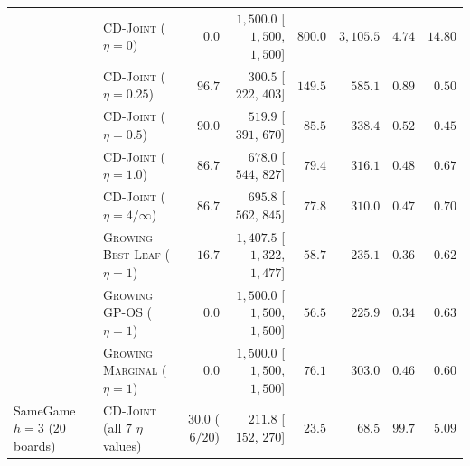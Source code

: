 \documentclass{article}
\theoremstyle{plain}
\theoremstyle{definition}
\begin{document}
\begin{table}[!htbp]
{\begin{tabular}{@{}llrrrrrr@{}}
  & \textsc{CD-Joint} ($\eta{=}0$)      & $0.0$            & $1{,}500.0$ [$1{,}500$, $1{,}500$] & $800.0$ & $3{,}105.5$ & $4.74$  & $14.80$ \\
  & \textsc{CD-Joint} ($\eta{=}0.25$)   & $\mathbf{96.7}$  & $\mathbf{300.5}$ [$222$, $403$]    & $149.5$ & $585.1$     & $\mathbf{0.89}$ & $0.50$  \\
  & \textsc{CD-Joint} ($\eta{=}0.5$)    & $90.0$           & $519.9$ [$391$, $670$]             & $85.5$  & $338.4$     & $0.52$  & $0.45$  \\
  & \textsc{CD-Joint} ($\eta{=}1.0$)    & $86.7$           & $678.0$ [$544$, $827$]             & $79.4$  & $316.1$     & $0.48$  & $0.67$  \\
  & \textsc{CD-Joint} ($\eta{=}4 / \infty$) & $86.7$       & $695.8$ [$562$, $845$]             & $77.8$  & $310.0$     & $0.47$  & $0.70$  \\
  & \textsc{Growing Best-Leaf} ($\eta{=}1$) & $16.7$       & $1{,}407.5$ [$1{,}322$, $1{,}477$] & $58.7$  & $235.1$     & $0.36$  & $0.62$  \\
  & \textsc{Growing GP-OS} ($\eta{=}1$)     & $0.0$        & $1{,}500.0$ [$1{,}500$, $1{,}500$] & $56.5$  & $225.9$     & $0.34$  & $0.63$  \\
  & \textsc{Growing Marginal} ($\eta{=}1$)  & $0.0$        & $1{,}500.0$ [$1{,}500$, $1{,}500$] & $76.1$  & $303.0$     & $0.46$  & $0.60$  \\
\midrule
SameGame $h{=}3$ ($20$ boards) & \textsc{CD-Joint} (all $7$ $\eta$ values) & $30.0$ ($6/20$) & $211.8$ [$152$, $270$] & $23.5$ & $68.5$ & $99.7$ & $5.09$ \\
\bottomrule
\end{tabular}%
}
\end{table}
\end{document}

